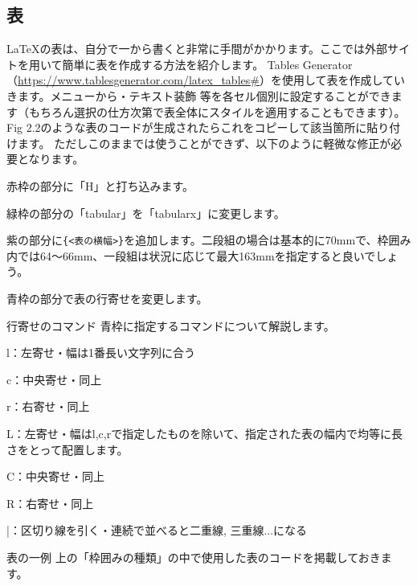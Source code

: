 \begin{multicols*}{2}
\section{表}
\LaTeX の表は、自分で一から書くと非常に手間がかかります。ここでは外部サイトを用いて簡単に表を作成する方法を紹介します。
Tables Generator（\url{https://www.tablesgenerator.com/latex_tables#}）を使用して表を作成していきます。メニューから・テキスト装飾
等を各セル個別に設定することができます（もちろん選択の仕方次第で表全体にスタイルを適用することもできます）。
Fig 2.2のような表のコードが生成されたらこれをコピーして該当箇所に貼り付けます。
ただしこのままでは使うことができず\footnotemark[2]、以下のように軽微な修正が必要となります。
\begin{enumcircle}
    \item 赤枠の部分に「H」と打ち込みます。
    \item 緑枠の部分の「tabular」を「tabularx」に変更します。
    \item 紫の部分に\verb|{<表の横幅>}|を追加します。二段組の場合は基本的に70mmで、枠囲み内では64〜66mm、一段組は状況に応じて最大163mmを指定すると良いでしょう。
    \item 青枠の部分で表の行寄せを変更します。
\end{enumcircle}
\begin{framebox-ref}{行寄せのコマンド}
青枠に指定するコマンドについて解説します。
\begin{reitemize}
    \item l：左寄せ・幅は1番長い文字列に合う
    \item c：中央寄せ・同上
    \item r：右寄せ・同上
    \item L：左寄せ・幅はl,c,rで指定したものを除いて、指定された表の幅内で均等に長さをとって配置します。
    \item C：中央寄せ・同上
    \item R：右寄せ・同上
    \item |：区切り線を引く・連続で並べると二重線, 三重線...になる
\end{reitemize}
\end{framebox-ref}
\begin{framebox-ref}{表の一例}
上の「枠囲みの種類」の中で使用した表のコードを掲載しておきます。\\


\end{framebox-ref}
\end{multicols*}
